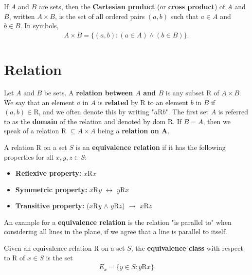 \begin{definition}
	If $A$ and $B$ are sets, then the \textbf{Cartesian product} (or \textbf{cross product}) of $A$ and $B$, written $A\times B$, is the set of all ordered pairs $(a,b)$ such that $a\in A$ and $b\in B$. In symbols,
	\begin{align*}
		A\times B = \{(a,b):(a\in A) \land (b\in B)\}.
	\end{align*}
\end{definition}

\newpage
\section{Relation}

\begin{definition}[Relation]
	Let $A$ and $B$ be sets. A \textbf{relation between $A$ and $B$} is any subset R of $A\times B$. We say that an element $a$ in $A$ is \textbf{related} by R to an element $b$ in $B$ if $(a,b)\in \text{R}$, and we often denote this by writing "$a\text{R}b$". The first set $A$ is referred to as the \textbf{domain} of the relation and denoted by dom R. If $B=A$, then we speak of a relation R $\subseteq A\times A$ being a \textbf{relation on A}.
\end{definition}

\begin{definition}
	A relation R on a set $S$ is an \textbf{equivalence relation} if it has the following properties for all $x,y,z \in S$:
	\begin{itemize}
		\item \textbf{Reflexive property:} $x$R$x$
		\item \textbf{Symmetric property:} $x$R$y$ $\leftrightarrow$ $y$R$x$
		\item \textbf{Transitive property:} ($x$R$y$ $\land$ $y$R$z$) $\rightarrow$ $x$R$z$
	\end{itemize}
\end{definition}

An example for a \textbf{equivalence relation} is the relation "is parallel to" when considering all lines in the plane, if we agree that a line is parallel to itself.

\begin{definition}
	\label{Equivalence Class}
	Given an equivalence relation R on a set $S$, the \textbf{equivalence class} with respect to R of $x\in S$ is the set
	\begin{align*}
		E_x = \{y\in S:y\text{R}x\}
	\end{align*}
\end{definition}

